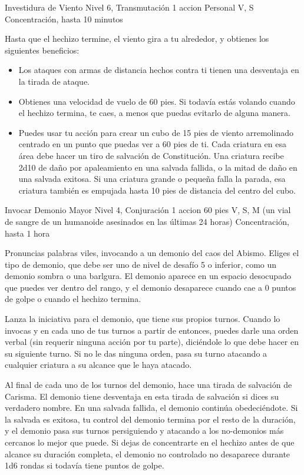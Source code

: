 \documentclass[a4paper,twocolumn,openany,10pt]{dndbook}
\begin{document}
\spellheader%
	{Investidura de Viento}
	{Nivel 6, Transmutación}
	{1 accion}
	{Personal}
	{V, S}
	{Concentración, hasta 10 minutos}
	
	Hasta que el hechizo termine, el viento gira a tu alrededor, y obtienes los siguientes beneficios:
	\begin{itemize}
		\item Los ataques con armas de distancia hechos contra ti tienen una desventaja en la tirada de ataque.
		
		\item Obtienes una velocidad de vuelo de 60 pies. Si todavía estás volando cuando el hechizo termina, te caes, a menos
		que puedas evitarlo de alguna manera.
		
		\item Puedes usar tu acción para crear un cubo de 15 pies de viento arremolinado centrado en un punto que puedas ver a
		60 pies de ti. Cada criatura en esa área debe hacer un tiro de salvación de Constitución. Una criatura recibe 2d10 de
		daño por apaleamiento en una salvada fallida, o la mitad de daño en una salvada exitosa. Si una criatura grande o
		pequeña falla la parada, esa criatura también es empujada hasta 10 pies de distancia del centro del cubo. 
	\end{itemize}

\spellheader%
	{Invocar Demonio Mayor}
	{Nivel 4, Conjuración}
	{1 accion}
	{60 pies}
	{V, S, M (un vial de sangre de un humanoide asesinados en las últimas 24 horas)}
	{Concentración, hasta 1 hora}
	
	Pronuncias palabras viles, invocando a un demonio del caos del Abismo. Eliges el tipo de demonio, que debe ser uno de nivel
	de desafío 5 o inferior, como un demonio sombra o una barlgura. El demonio aparece en un espacio desocupado que puedes ver
	dentro del rango, y el demonio desaparece cuando cae a 0 puntos de golpe o cuando el hechizo termina.
	
	Lanza la iniciativa para el demonio, que tiene sus propios turnos. Cuando lo invocas y en cada uno de tus turnos a partir de
	entonces, puedes darle una orden verbal (sin requerir ninguna acción por tu parte), diciéndole lo que debe hacer en su
	siguiente turno. Si no le das ninguna orden, pasa su turno atacando a cualquier criatura a su alcance que le haya atacado.
	
	Al final de cada uno de los turnos del demonio, hace una tirada de salvación de Carisma. El demonio tiene desventaja en esta
	tirada de salvación si dices su verdadero nombre. En una salvada fallida, el demonio continúa obedeciéndote. Si la salvada
	es exitosa, tu control del demonio termina por el resto de la duración, y el demonio pasa sus turnos persiguiendo y atacando
	a los no-demonios más cercanos lo mejor que puede. Si dejas de concentrarte en el hechizo antes de que alcance su duración
	completa, el demonio no controlado no desaparece durante 1d6 rondas si todavía tiene puntos de golpe.
	
\end{document}
